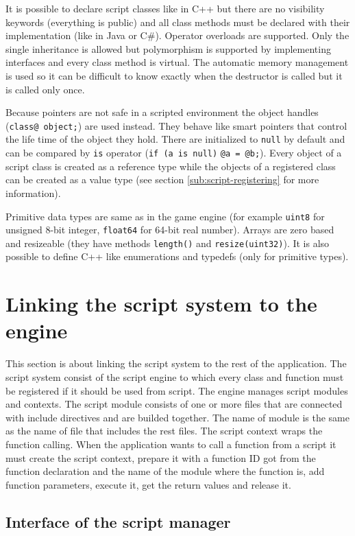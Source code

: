 It is possible to declare script classes like in C++ but there are no visibility keywords (everything is public) and all class methods must be declared with their implementation (like in Java or C\#). Operator overloads are supported. Only the single inheritance is allowed but polymorphism is supported by implementing interfaces and every class method is virtual. The automatic memory management is used so it can be difficult to know exactly when the destructor is called but it is called only once.

Because pointers are not safe in a scripted environment the object handles (\verb/class@ object;/) are used instead. They behave like smart pointers that control the life time of the object they hold. There are initialized to \verb/null/ by default and can be compared by \verb/is/ operator (\verb/if (a is null)/ \verb/@a = @b;/). Every object of a script class is created as a reference type while the objects of a registered class can be created as a value type (see section \ref{sub:script-registering} for more information).

Primitive data types are same as in the game engine (for example \verb/uint8/ for unsigned 8-bit integer, \verb/float64/ for 64-bit real number). Arrays are zero based and resizeable (they have methods \verb/length()/ and \verb/resize(uint32)/). It is also possible to define C++ like enumerations and typedefs (only for primitive types).

\section{Linking the script system to the engine}

This section is about linking the script system to the rest of the application. The script system consist of the script engine to which every class and function must be registered if it should be used from script. The engine manages script modules and contexts. The script module consists of one or more files that are connected with include directives and are builded together. The name of module is the same as the name of file that includes the rest files. The script context wraps the function calling. When the application wants to call a function from a script it must create the script context, prepare it with a function ID got from the function declaration and the name of the module where the function is, add function parameters, execute it, get the return values and release it.

\subsection{Interface of the script manager}

